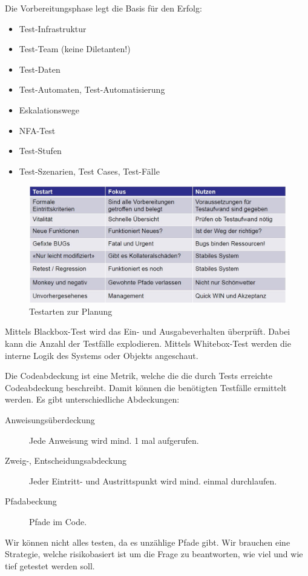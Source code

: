 Die Vorbereitungsphase legt die Basis für den Erfolg:

\begin{itemize}
	\item Test-Infrastruktur
	\item Test-Team (keine Diletanten!)
	\item Test-Daten
	\item Test-Automaten, Test-Automatisierung
	\item Eskalationswege
	\item NFA-Test
	\item Test-Stufen
	\item Test-Szenarien, Test Cases, Test-Fälle
\end{itemize}

\begin{figure}[h!]
\centering
\includegraphics[width=0.7\linewidth]{fig/testarten-zur-planung}
\caption{Testarten zur Planung}
\label{fig:testarten-zur-planung}
\end{figure}

Mittels Blackbox-Test wird das Ein- und Ausgabeverhalten überprüft. Dabei kann die Anzahl der Testfälle explodieren. Mittels Whitebox-Test werden die interne Logik des Systems oder Objekts angeschaut. 

Die Codeabdeckung ist eine Metrik, welche die die durch Tests erreichte Codeabdeckung beschreibt. Damit können die benötigten Testfälle ermittelt werden. Es gibt unterschiedliche Abdeckungen:
\begin{description}
	\item[Anweisungsüberdeckung] Jede Anweisung wird mind. 1 mal aufgerufen.
	\item[Zweig-, Entscheidungsabdeckung] Jeder Eintritt- und Austrittspunkt wird mind. einmal durchlaufen.
	\item[Pfadabeckung] Pfade im Code.
\end{description}

Wir können nicht alles testen, da es unzählige Pfade gibt. Wir brauchen eine Strategie, welche risikobasiert ist um die Frage zu beantworten, wie viel und wie tief getestet werden soll.

